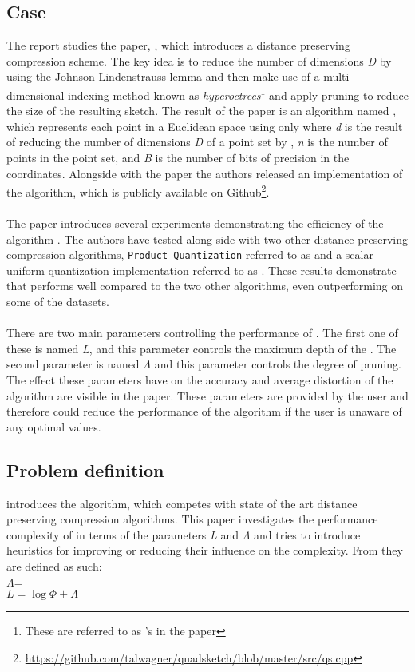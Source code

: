 \subsection{Case} %
The report studies the paper, \cite{wagner17}, which introduces a distance preserving compression scheme. The key idea is to reduce the number of dimensions \textit{D} by using the Johnson-Lindenstrauss lemma \cite{JohnL} and then make use of a multi-dimensional indexing method known as \textit{hyperoctrees}\footnote{These are referred to as \qt{}'s in the paper} and apply pruning to reduce the size of the resulting sketch. The result of the paper is an algorithm named \qs{}, which represents each point in a Euclidean space using only  where \textit{d} is the result of reducing the number of dimensions \textit{D} of a point set by , \textit{n} is the number of points in the point set, and \textit{B} is the number of bits of precision in the coordinates. Alongside with the paper the authors released an implementation of the algorithm, which is publicly available on Github\footnote{\url{https://github.com/talwagner/quadsketch/blob/master/src/qs.cpp}}. 
\\
\\
The paper introduces several experiments demonstrating the efficiency of the algorithm \qs{}. The authors have tested \qs{} along side with two other distance preserving compression algorithms, \texttt{Product Quantization} referred to as \pq{} and a scalar uniform quantization implementation referred to as \gr{}. These results demonstrate that \qs{} performs well compared to the two other algorithms, even outperforming \pq{} on some of the datasets. 
\\
\\
There are two main parameters controlling the performance of \qs{}. The first one of these is named \textit{L}, and this parameter controls the maximum depth of the \qt{}. The second parameter is named $\Lambda$ and this parameter controls the degree of pruning. The effect these parameters have on the accuracy and average distortion of the algorithm are visible in the paper. These parameters are provided by the user and therefore could reduce the performance of the algorithm if the user is unaware of any optimal values.
\subsection{Problem definition} %
\cite{wagner17} introduces the \qs{} algorithm, which competes with state of the art distance preserving compression algorithms. This paper investigates the performance complexity of \qs{} in terms of the parameters \textit{L} and $\Lambda$ and tries to introduce heuristics for improving or reducing their influence on the complexity. From  they are defined as such: \\

$\Lambda$=\\

\ensuremath{L=\log \Phi + \Lambda}

